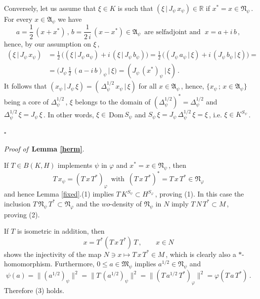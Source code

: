 \documentclass[reqno]{amsart}
\theoremstyle{definition}
\theoremstyle{remark}
\numberwithin{equation}{section}
\theoremstyle{plain}
\begin{document}
Conversely, let us assume that $\xi\in K$ is such that $(\xi\, |\, J_\psi\,
x_\psi )\in\mathbb R$ if $x^*=x\in\mathfrak N_\psi\,$. For every
$x\in\mathfrak A_\psi$ we have
\begin{equation*}
a=\frac 12\, (x+x^*)\, ,\, b=\frac 1{2\, i}\, (x-x^*)\in
\mathfrak A_\psi\,\text{ are selfadjoint and }\; x=a+i\, b\, ,
\end{equation*}
hence, by our assumption on $\xi\,$,
\begin{align*}
(\xi\, |\, J_\psi\,x_\psi ) &=\frac 12\,\big( (\xi\, |\, J_\psi\,
a_\psi ) +i\, (\xi\, |\, J_\psi\,b_\psi )\big) =\frac 12\,\big(
(J_\psi\, a_\psi\, |\,\xi ) +i\, (J_\psi\, b_\psi\, |\,\xi )
\big) = \\
&=\big( J_\psi\, \frac 12\, (a-i\, b)_\psi\, |\,\xi\big) =
(J_\psi\, (x^*)_\psi\, |\,\xi )\, .
\end{align*}
It follows that $(x_\psi\, |\, J_\psi\,\xi ) =(\,\Delta_\psi^{1/2}\,
x_\psi\, |\,\xi )$ for all $x\in\mathfrak A_\psi\,$, hence,
$\{ x_\psi\, ;\, x\in\mathfrak A_\psi\}$ being a core of
$\Delta_\psi^{1/2}\,$, $\xi$ belongs to the domain of
$(\Delta_\psi^{1/2})^*=\Delta_\psi^{1/2}$ and $\Delta_\psi^{1/2}\,\xi
=J_\psi\,\xi\,$. In other words, $\xi\in\,$Dom$\, S_\psi$ and
$S_\psi\,\xi =J_\psi\,\Delta_\psi^{1/2}\,\xi =\xi\,$, i.e.
$\xi\in K^{S_\psi}\,$.

\hfill $\square\quad$
\medskip

{\it Proof of }$\,${\bf Lemma \ref{herm}}.
\medskip

If $T\in B(K,H)$ implements $\psi$ in $\varphi$ and $x^*=x\in
\mathfrak N_\psi\,$, then
\begin{equation*}
T\, x_\psi =(T\, x\, T^*)_\varphi\,\text{ with }\, (T\, x\, T^*)^* =
T\, x\, T^*\in\mathfrak N_\varphi
\end{equation*}
and hence Lemma \ref{fixed}.(1) implies $T\, K^{S_\psi}\subset
H^{S_\varphi}\,$, proving (1). In this case the inclusion
$T\,\mathfrak N_\psi\, T^*\subset\mathfrak N_\varphi$ and the
$wo$-density of $\mathfrak N_\psi$ in $N$ imply $T\, N\, T^*
\subset M\,$, proving (2).

If $T$ is isometric in addition, then
\begin{equation*}
x=T^*(T\, x\, T^*)\, T\, ,\qquad x\in N
\end{equation*}
shows the injectivity of the map $N\ni x\longmapsto T\, x\, T^*\in
M\,$, which is clearly also a $*$-homomorphism. Furthermore, $0\leq
a\in\mathfrak M_\psi$ implies $a^{1/2}\in\mathfrak N_\psi$ and
\begin{equation*}
\psi (a) =\| (a^{1/2})_\psi\|^2 =\| T\, (a^{1/2})_\psi\|^2 =
\| (T\, a^{1/2}\, T^*)_\varphi\|^2 =\varphi (T\, a\, T^*)\, .
\end{equation*}
Therefore (3) holds.
\end{document}

